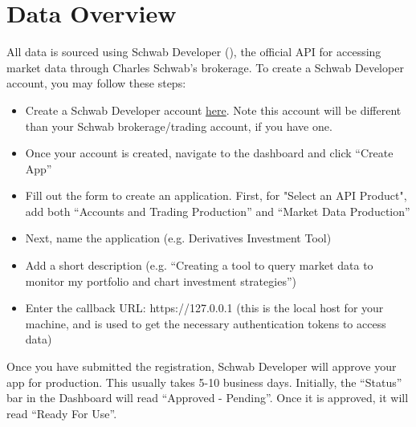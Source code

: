\documentclass{article}
\begin{document}
\section{Data Overview}

\indent All data is sourced using Schwab Developer (\cite{schwab_developer}), the official API for accessing market data through Charles Schwab's brokerage. To create a Schwab Developer account, you may follow these steps: 

\begin{itemize}
    \item Create a Schwab Developer account \href{https://developer.schwab.com/register}{here}. Note this account will be different than your Schwab brokerage/trading account, if you have one. 
    \item Once your account is created, navigate to the dashboard and click \enquote{Create App}
    \item Fill out the form to create an application. First, for "Select an API Product", add both \enquote{Accounts and Trading Production} and \enquote{Market Data Production} 
    \item Next, name the application (e.g. Derivatives Investment Tool)
    \item Add a short description (e.g. \enquote{Creating a tool to query market data to monitor my portfolio and chart investment strategies})
    \item Enter the callback URL: https://127.0.0.1 (this is the local host for your machine, and is used to get the necessary authentication tokens to access data)

\end{itemize}

\indent Once you have submitted the registration, Schwab Developer will approve your app for production. This usually takes 5-10 business days. Initially, the \enquote{Status} bar in the Dashboard will read \enquote{Approved - Pending}. Once it is approved, it will read \enquote{Ready For Use}. 
\end{document}
